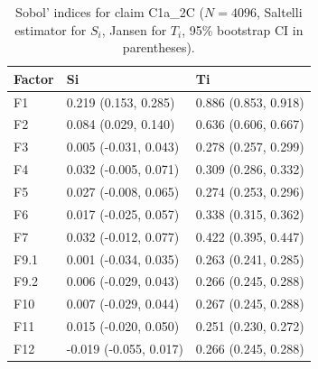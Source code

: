 \begin{table}[ht]
\centering
\caption{Sobol' indices for claim C1a_2C ($N=4096$, Saltelli estimator for $S_i$, Jansen for $T_i$, 95\% bootstrap CI in parentheses).} 
\label{tab:sobol_C1a_2C}
\begin{tabular}{lll}
  \hline
Factor & Si & Ti \\ 
  \hline
F1 & 0.219 (0.153, 0.285) & 0.886 (0.853, 0.918) \\ 
  F2 & 0.084 (0.029, 0.140) & 0.636 (0.606, 0.667) \\ 
  F3 & 0.005 (-0.031, 0.043) & 0.278 (0.257, 0.299) \\ 
  F4 & 0.032 (-0.005, 0.071) & 0.309 (0.286, 0.332) \\ 
  F5 & 0.027 (-0.008, 0.065) & 0.274 (0.253, 0.296) \\ 
  F6 & 0.017 (-0.025, 0.057) & 0.338 (0.315, 0.362) \\ 
  F7 & 0.032 (-0.012, 0.077) & 0.422 (0.395, 0.447) \\ 
  F9.1 & 0.001 (-0.034, 0.035) & 0.263 (0.241, 0.285) \\ 
  F9.2 & 0.006 (-0.029, 0.043) & 0.266 (0.245, 0.288) \\ 
  F10 & 0.007 (-0.029, 0.044) & 0.267 (0.245, 0.288) \\ 
  F11 & 0.015 (-0.020, 0.050) & 0.251 (0.230, 0.272) \\ 
  F12 & -0.019 (-0.055, 0.017) & 0.266 (0.245, 0.288) \\ 
   \hline
\end{tabular}
\end{table}

